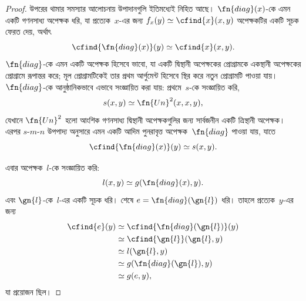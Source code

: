 \documentclass[../../../include/open-logic-section]{subfiles}
\begin{document}
\begin{proof}
উপরের থামার সমস্যার আলোচনায় উপাদানগুলি ইতিমধ্যেই নিহিত আছে।
$\fn{diag}(x)$-কে এমন একটি গণনসাধ্য অপেক্ষক ধরি, যা প্রত্যেক~$x$-এর
জন্য $f_x(y) \simeq \cfind{x}(x,y)$ অপেক্ষকটির একটি সূচক ফেরত দেয়,
অর্থাৎ
\[
\cfind{\fn{diag}(x)}(y) \simeq \cfind{x}(x,y).
\]
$\fn{diag}$-কে এমন একটি অপেক্ষক হিসেবে ভাবো, যা একটি দ্বিস্থানী অপেক্ষকের
প্রোগ্রামকে একস্থানী অপেক্ষকের প্রোগ্রামে রূপান্তর করে; মূল প্রোগ্রামটিকেই
তার প্রথম আর্গুমেন্ট হিসেবে স্থির করে নতুন প্রোগ্রামটি পাওয়া যায়।
$\fn{diag}$-কে আনুষ্ঠানিকভাবে এভাবে সংজ্ঞায়িত করা যায়: প্রথমে~$s$-কে
সংজ্ঞায়িত করি,
\[
s(x,y) \simeq \fn{Un}^2(x,x,y),
\]
যেখানে $\fn{Un}^2$ হলো আংশিক গণনসাধ্য দ্বিস্থানী অপেক্ষকগুলির জন্য
সার্বজনীন একটি ত্রিস্থানী অপেক্ষক। এরপর $s$-$m$-$n$ উপপাদ্য অনুসারে এমন
একটি আদিম পুনরাবৃত্ত অপেক্ষক~$\fn{diag}$ পাওয়া যায়, যাতে
\[
\cfind{\fn{diag}(x)}(y) \simeq s(x,y).
\]

এবার অপেক্ষক~$l$-কে সংজ্ঞায়িত করি:
\[
l(x,y) \simeq g(\fn{diag}(x),y).
\]
এবং $\gn{l}$-কে~$l$-এর একটি সূচক ধরি। শেষে
$e = \fn{diag}(\gn{l})$ ধরি। তাহলে প্রত্যেক~$y$-এর জন্য
\begin{align*}
\cfind{e}(y) & \simeq \cfind{\fn{diag}(\gn{l})}(y) \\
& \simeq \cfind{\gn{l}}(\gn{l}, y) \\
& \simeq l(\gn{l}, y) \\
& \simeq g(\fn{diag}(\gn{l}),y) \\
& \simeq g(e, y),
\end{align*}
যা প্রয়োজন ছিল।
\end{proof}
\end{document}
